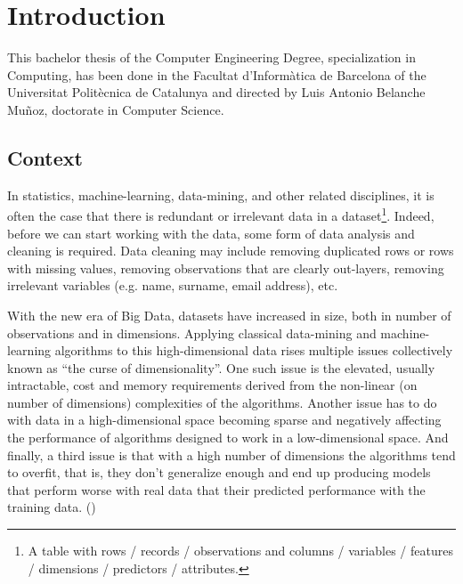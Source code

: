 
\chapter{Introduction} %

\label{Chapter1} %


This bachelor thesis of the Computer Engineering Degree, specialization in Computing, has been done in the Facultat d’Informàtica de Barcelona of the Universitat Politècnica de Catalunya and directed by Luis Antonio Belanche Muñoz, doctorate in Computer Science.

\section{Context}

In statistics, machine-learning, data-mining, and other related disciplines, it is often the case that there is redundant or irrelevant data in a dataset\footnote{A table with rows / records / observations and columns / variables / features / dimensions / predictors / attributes.}. Indeed, before we can start working with the data, some form of data analysis and cleaning is required. Data cleaning may include removing duplicated rows or rows with missing values, removing observations that are clearly out-layers, removing irrelevant variables (e.g. name, surname, email address), etc.

With the new era of Big Data, datasets have increased in size, both in number of observations and in dimensions. Applying classical data-mining and machine-learning algorithms to this high-dimensional data rises multiple issues collectively known as “the curse of dimensionality”. One such issue is the elevated, usually intractable, cost and memory requirements derived from the non-linear (on number of dimensions) complexities of the algorithms. Another issue has to do with data in a high-dimensional space becoming sparse and negatively affecting the performance of algorithms designed to work in a low-dimensional space. And finally, a third issue is that with a high number of dimensions the algorithms tend to overfit, that is, they don't generalize enough and end up producing models that perform worse with real data that their predicted performance with the training data. (\cite{li_feature_2017})

